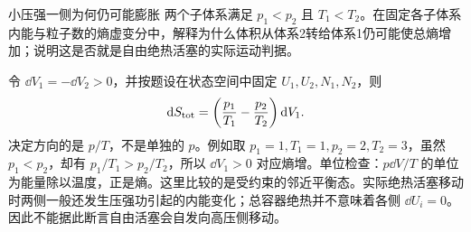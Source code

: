\begin{advexamplebox}{小压强一侧为何仍可能膨胀}\label{advA2:ex:pressure-temperature}
两个子体系满足 $p_1<p_2$ 且 $T_1<T_2$。在固定各子体系内能与粒子数的熵虚变分中，解释为什么体积从体系2转给体系1仍可能使总熵增加；说明这是否就是自由绝热活塞的实际运动判据。

\AQEntropyVolume
\end{advexamplebox}
\begin{advsolution}
\AAEntropyVolume

令 $\dd V_1=-\dd V_2>0$，并按题设在状态空间中固定 $U_1,U_2,N_1,N_2$，则
\[
 \mathop{}\!\mathrm d S_{\rm tot}
 =\left(\frac{p_1}{T_1}-\frac{p_2}{T_2}\right)\mathop{}\!\mathrm d V_1.
\]
决定方向的是 $p/T$，不是单独的 $p$。例如取
$p_1=1,T_1=1,p_2=2,T_2=3$，虽然 $p_1<p_2$，却有
$p_1/T_1>p_2/T_2$，所以 $\dd V_1>0$ 对应熵增。单位检查：$p\dd V/T$ 的单位为能量除以温度，正是熵。这里比较的是受约束的邻近平衡态。实际绝热活塞移动时两侧一般还发生压强功引起的内能变化；总容器绝热并不意味着各侧 $\dd U_i=0$。因此不能据此断言自由活塞会自发向高压侧移动。
\end{advsolution}

